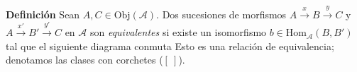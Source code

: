 \documentclass[preview]{standalone}
\begin{document}
\begin{center}
\textbf{Definición} Sean $A,C\in\text{Obj}(\mathscr{A})$. Dos sucesiones de morfismos $A\xrightarrow{x}B\xrightarrow{y}C$ y $A\xrightarrow{x'}B'\xrightarrow{y'}C$ en $\mathscr{A}$ son \emph{equivalentes} si existe un isomorfismo $b\in\text{Hom}_\mathscr{A}(B,B')$ tal que el siguiente diagrama conmuta \break \vspace{5mm}Esto es una relación de equivalencia; denotamos las clases con corchetes ($[ \ ]$).
\end{center}
\end{document}
